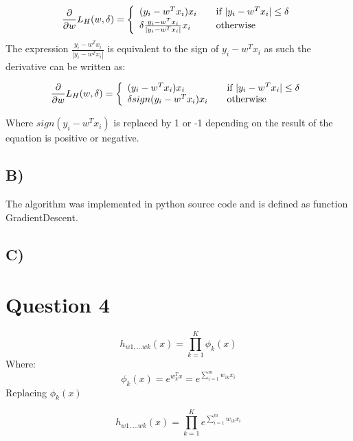 \documentclass{report}
\begin{document}
  \begin{equation}
    \frac{\partial}{\partial w} L_H(w, \delta) = \left\{
    \begin{array}{l l}
      (y_i - w^Tx_i) x_i & \quad \text{if }  | y_i - w^Tx_i | \leq \delta\\
      \delta \frac{y_i - w^Tx_i}{| y_i - w^Tx_i |} x_i & \quad \text{otherwise}

    \end{array} \right.\end{equation}
The expression $\frac{y_i - w^Tx_i}{| y_i - w^Tx_i |}$ is equivalent to the sign
of $y_i - w^Tx_i$ as such the derivative can be written as:

\begin{equation}
  \frac{\partial}{\partial w} L_H(w, \delta) = \left\{
  \begin{array}{l l}
    (y_i - w^Tx_i) x_i & \quad \text{if }  | y_i - w^Tx_i | \leq \delta\\
    \delta sign ( y_i - w^Tx_i ) x_i & \quad \text{otherwise}

  \end{array} \right.\end{equation}

Where $sign(y_i - w^Tx_i)$ is replaced by 1 or -1 depending on the result of the
equation is positive or negative.

\subsection*{B)}
The algorithm was implemented in python source code and is defined as function
GradientDescent.
\subsection*{C)}


\section*{Question 4}

  \begin{equation}
    h_{w1,...wk}(x)
    = \prod_{k=1}^{K}\phi_k(x)
  \end{equation}
Where:
  \begin{equation}
    \phi_k(x) = e^{w_k^Tx}
    = e^{\sum_{i=1}^m w_{ik}x_i}
  \end{equation}
Replacing $\phi_k(x)$

  \begin{equation}
    h_{w1,...wk}(x)
    = \prod_{k=1}^{K}e^{\sum_{i=1}^m w_{ik}x_i}
  \end{equation}
\end{document}
